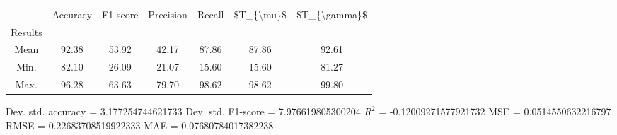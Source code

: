 \begin{tabular}{|c|c|c|c|c|c|c|}
\toprule
{} &  Accuracy &  F1 score &  Precision &  Recall &  \$T\_\{\textbackslash mu\}\$ &  \$T\_\{\textbackslash gamma\}\$ \\
Results &           &           &            &         &            &               \\
\hline
Mean    &     92.38 &     53.92 &      42.17 &   87.86 &      87.86 &         92.61 \\
Min.    &     82.10 &     26.09 &      21.07 &   15.60 &      15.60 &         81.27 \\
Max.    &     96.28 &     63.63 &      79.70 &   98.62 &      98.62 &         99.80 \\
\bottomrule
\end{tabular}

 Dev. std. accuracy = 3.177254744621733
 Dev. std. F1-score = 7.976619805300204
 $R^2$ = -0.12009271577921732
 MSE = 0.0514550632216797
 RMSE = 0.22683708519922333
 MAE = 0.07680784017382238